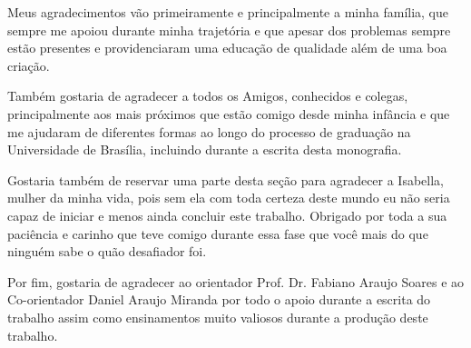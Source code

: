 \begin{agradecimentos}
Meus agradecimentos vão primeiramente e principalmente a minha família, que sempre me apoiou durante minha trajetória e que apesar dos problemas sempre estão presentes e providenciaram uma educação de qualidade além de uma boa criação.

Também gostaria de agradecer a todos os Amigos, conhecidos e colegas, principalmente aos mais próximos que estão comigo desde minha infância e que me ajudaram de diferentes formas ao longo do processo de graduação na Universidade de Brasília, incluindo durante a escrita desta monografia.

Gostaria também de reservar uma parte desta seção para agradecer a Isabella, mulher da minha vida, pois sem ela com toda certeza deste mundo eu não seria capaz de iniciar e menos ainda concluir este trabalho. Obrigado por toda a sua paciência e carinho que teve comigo durante essa fase que você mais do que ninguém sabe o quão desafiador foi.

Por fim, gostaria de agradecer ao orientador Prof. Dr. Fabiano Araujo Soares e ao Co-orientador Daniel Araujo Miranda por todo o apoio durante a escrita do trabalho assim como ensinamentos muito valiosos durante a produção deste trabalho.
\end{agradecimentos}
